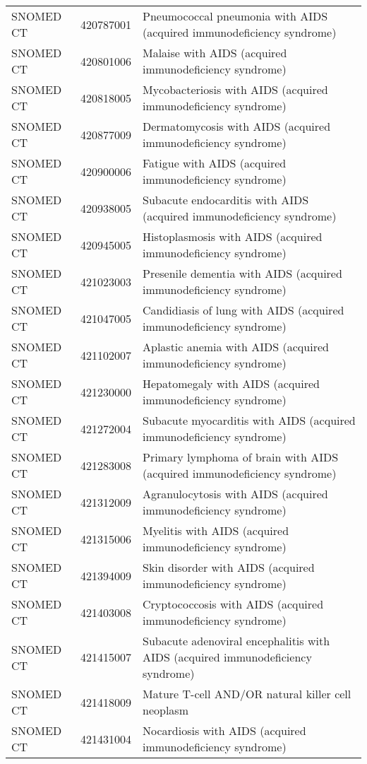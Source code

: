 \begin{longtable}{p{}p{}p{}}
  SNOMED CT & 420787001 & Pneumococcal pneumonia with AIDS (acquired immunodeficiency syndrome) \\ 
  SNOMED CT & 420801006 & Malaise with AIDS (acquired immunodeficiency syndrome) \\ 
  SNOMED CT & 420818005 & Mycobacteriosis with AIDS (acquired immunodeficiency syndrome) \\ 
  SNOMED CT & 420877009 & Dermatomycosis with AIDS (acquired immunodeficiency syndrome) \\ 
  SNOMED CT & 420900006 & Fatigue with AIDS (acquired immunodeficiency syndrome) \\ 
  SNOMED CT & 420938005 & Subacute endocarditis with AIDS (acquired immunodeficiency syndrome) \\ 
  SNOMED CT & 420945005 & Histoplasmosis with AIDS (acquired immunodeficiency syndrome) \\ 
  SNOMED CT & 421023003 & Presenile dementia with AIDS (acquired immunodeficiency syndrome) \\ 
  SNOMED CT & 421047005 & Candidiasis of lung with AIDS (acquired immunodeficiency syndrome) \\ 
  SNOMED CT & 421102007 & Aplastic anemia with AIDS (acquired immunodeficiency syndrome) \\ 
  SNOMED CT & 421230000 & Hepatomegaly with AIDS (acquired immunodeficiency syndrome) \\ 
  SNOMED CT & 421272004 & Subacute myocarditis with AIDS (acquired immunodeficiency syndrome) \\ 
  SNOMED CT & 421283008 & Primary lymphoma of brain with AIDS (acquired immunodeficiency syndrome) \\ 
  SNOMED CT & 421312009 & Agranulocytosis with AIDS (acquired immunodeficiency syndrome) \\ 
  SNOMED CT & 421315006 & Myelitis with AIDS (acquired immunodeficiency syndrome) \\ 
  SNOMED CT & 421394009 & Skin disorder with AIDS (acquired immunodeficiency syndrome) \\ 
  SNOMED CT & 421403008 & Cryptococcosis with AIDS (acquired immunodeficiency syndrome) \\ 
  SNOMED CT & 421415007 & Subacute adenoviral encephalitis with AIDS (acquired immunodeficiency syndrome) \\ 
  SNOMED CT & 421418009 & Mature T-cell AND/OR natural killer cell neoplasm \\ 
  SNOMED CT & 421431004 & Nocardiosis with AIDS (acquired immunodeficiency syndrome) \\ 

\end{longtable}
